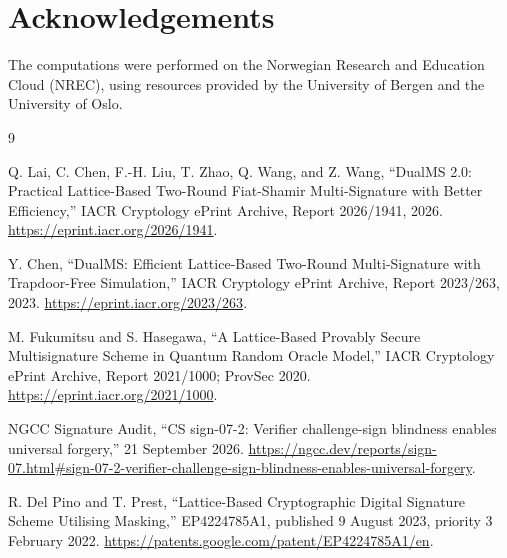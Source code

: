 \documentclass[10pt,a4paper]{article}
\begin{document}
\section*{Acknowledgements}

The computations were performed on the Norwegian Research and Education Cloud (NREC), using resources provided by the University of Bergen and the University of Oslo.

\begin{thebibliography}{9}

Q. Lai, C. Chen, F.-H. Liu, T. Zhao, Q. Wang, and Z. Wang,
``DualMS 2.0: Practical Lattice-Based Two-Round Fiat-Shamir Multi-Signature
with Better Efficiency,'' IACR Cryptology ePrint Archive, Report 2026/1941,
2026. \url{https://eprint.iacr.org/2026/1941}.

Y. Chen,
``DualMS: Efficient Lattice-Based Two-Round Multi-Signature with
Trapdoor-Free Simulation,'' IACR Cryptology ePrint Archive, Report 2023/263,
2023. \url{https://eprint.iacr.org/2023/263}.

M. Fukumitsu and S. Hasegawa,
``A Lattice-Based Provably Secure Multisignature Scheme in Quantum Random
Oracle Model,'' IACR Cryptology ePrint Archive, Report 2021/1000; ProvSec
2020. \url{https://eprint.iacr.org/2021/1000}.

NGCC Signature Audit,
``CS sign-07-2: Verifier challenge-sign blindness enables universal
forgery,'' 21 September 2026.
\url{https://ngcc.dev/reports/sign-07.html#sign-07-2-verifier-challenge-sign-blindness-enables-universal-forgery}.

R. Del Pino and T. Prest,
``Lattice-Based Cryptographic Digital Signature Scheme Utilising Masking,''
EP4224785A1, published 9 August 2023, priority 3 February 2022.
\url{https://patents.google.com/patent/EP4224785A1/en}.

\end{thebibliography}
\end{document}
